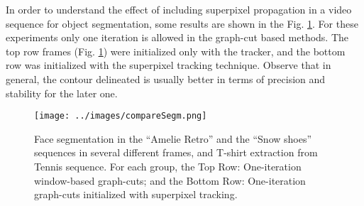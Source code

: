 In order to understand the effect of including superpixel propagation in a video sequence for object
segmentation, some results are shown in the Fig. \ref{figurelabel_comp}. For these experiments only one iteration is
allowed in the graph-cut based methods. The top row frames (Fig. \ref{figurelabel_comp}) were initialized only with the tracker, 
and the bottom row was initialized with the superpixel tracking technique. 
Observe that in general, the contour delineated is usually better in terms of precision and
stability for the later one.
   \begin{figure}[thp]
      \centering
      \texttt{[image: ../images/compareSegm.png]}
      \caption{Face segmentation in the “Amelie Retro” and the
	      “Snow shoes” sequences in several different frames, and T-shirt extraction from Tennis sequence. For each
	       group, the Top Row: One-iteration window-based graph-cuts;
	       and the Bottom Row: One-iteration graph-cuts initialized with superpixel tracking.}
      \label{figurelabel_comp}
   \end{figure}
